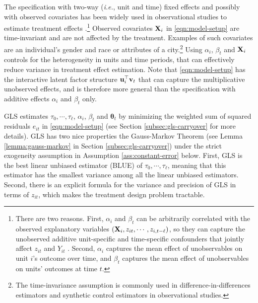 The specification with two-way ({\it i.e.}, unit and time) fixed effects and possibly with observed covariates has been widely used in observational studies to estimate treatment effects \citep{angrist2008mostly}.\footnote{There are two reasons. First, $\alpha_i$ and $\beta_t$ can be arbitrarily correlated with the observed explanatory variables $(\mathbf{X}_i, {z}_{it}, \cdots, {z}_{i,t-\ell})$, so they can capture the unobserved additive unit-specific and time-specific confounders that jointly affect ${z}_{it}$ and $Y_{it}$ \citep{angrist2008mostly}. Second, $\alpha_i$ captures the mean effect of unobservables on unit $i$'s outcome over time, and $\beta_t$ captures the mean effect of unobservables on units' outcomes at time $t$. } Observed covariates $\mathbf{X}_i$ in \eqref{eqn:model-setup} are time-invariant and are not affected by the treatment. Examples of such covariates are an individual's gender and race or attributes of a city.\footnote{The time-invariance assumption is commonly used in difference-in-differences estimators \citep{card1994minimum} 
and synthetic control estimators \citep{abadie2010synthetic} in observational studies.} Using $\alpha_i$, $\beta_t$ and $\mathbf{X}_i$ controls for the heterogeneity in units and time periods, that can effectively reduce variance in treatment effect estimation. Note that \eqref{eqn:model-setup} has the interactive latent factor structure $\mathbf{u}_i^\top \mathbf{v}_t$ that can capture the multiplicative unobserved effects, and is therefore more general than the specification with additive effects $\alpha_i$ and $\beta_t$ only. 

    	GLS estimates $\tau_0, \cdots, \tau_\ell$, $\alpha_i$, $\beta_t$ and $\bm{\theta}_t$ by minimizing the weighted sum of squared residuals $e_{it}$ in \eqref{eqn:model-setup} (see Section \ref{subsec:gls-carryover} for more details). GLS has two nice properties  the Gauss-Markov Theorem (see Lemma \ref{lemma:gauss-markov} in Section \ref{subsec:gls-carryover}) under the strict exogeneity assumption in Assumption \ref{ass:constant-error} below. First, GLS is the best linear unbiased estimator (BLUE) of $\tau_0, \cdots, \tau_\ell$, meaning that this estimator has the smallest variance among all the linear unbiased estimators. Second, there is an explicit formula for the variance and precision of GLS in terms of $z_{it}$, which makes the treatment design problem tractable. 
	
